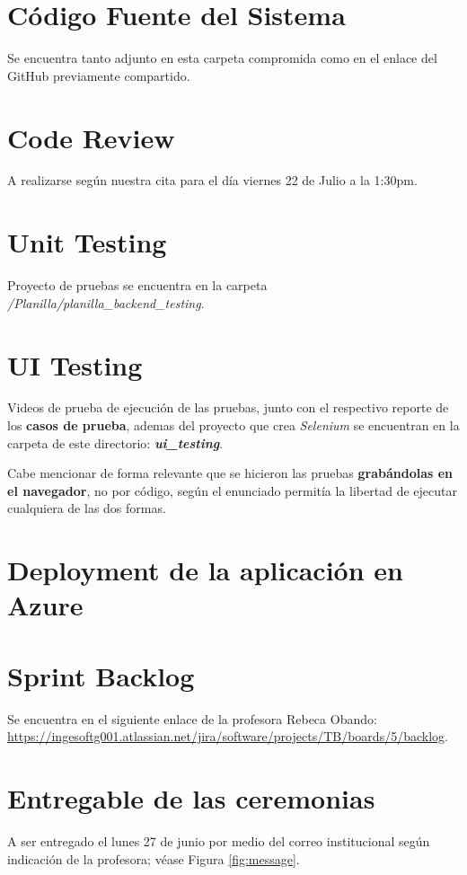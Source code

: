 \documentclass{article}
\begin{document}
%

\section{Código Fuente del Sistema}
Se encuentra tanto adjunto en esta carpeta compromida como en el enlace del GitHub
previamente compartido.

\section{Code Review}
A realizarse según nuestra cita para el día viernes 22 de Julio a la 1:30pm.

\section{Unit Testing}
Proyecto de pruebas se encuentra en la carpeta \textit{/Planilla/planilla\_backend\_testing}.

\section{UI Testing}
Videos de prueba de ejecución de las pruebas, junto con el respectivo reporte de los
\textbf{casos de prueba}, ademas del proyecto que crea \textit{Selenium} se encuentran
en la carpeta de este directorio: \textbf{\textit{ui\_testing}}.

Cabe mencionar de forma relevante que se hicieron las pruebas \textbf{grabándolas en el navegador},
no por código, según el enunciado permitía la libertad de ejecutar cualquiera de las dos formas.

\section{Deployment de la aplicación en Azure}

\section{Sprint Backlog}
Se encuentra en el siguiente enlace de la profesora Rebeca Obando: \url{https://ingesoftg001.atlassian.net/jira/software/projects/TB/boards/5/backlog}.

\section{Entregable de las ceremonias}
A ser entregado el lunes 27 de junio por medio del correo institucional según
indicación de la profesora; véase Figura \ref{fig:message}.
\end{document}

